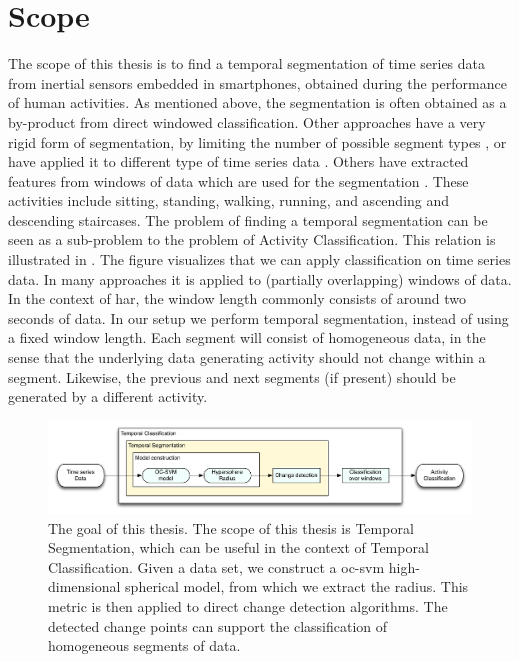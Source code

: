 \section{Scope}
The scope of this thesis is to find a temporal segmentation of time series data from inertial sensors embedded in smartphones, obtained during the performance of human activities.
As mentioned above, the segmentation is often obtained as a by-product from direct windowed classification.
Other approaches have a very rigid form of segmentation, \eg by limiting the number of possible segment types \cite{himberg2001time,chamroukhi2013joint}, or have applied it to different type of time series data \cite{li2007segmentation,fuchs2010online,guenterberg2009automatic}.
Others have extracted features from windows of data which are used for the segmentation \cite{guo2012adaptive}.
These activities include sitting, standing, walking, running, and ascending and descending staircases.
The problem of finding a temporal segmentation can be seen as a sub-problem to the problem of Activity Classification.
This relation is illustrated in .
The figure visualizes that we can apply classification on time series data.
In many approaches it is applied to (partially overlapping) windows of data.
In the context of \gls{har}, the window length commonly consists of around two seconds of data.
In our setup we perform temporal segmentation, instead of using a fixed window length.
Each segment will consist of homogeneous data, in the sense that the underlying data generating activity should not change within a segment.
Likewise, the previous and next segments (if present) should be generated by a different activity.

\begin{figure}[h]
  \centering
    \includegraphics[width=\textwidth,height=\textheight,keepaspectratio]{./Figures/chapter1/thesis_goal.pdf}
  \caption[Thesis goal]{The goal of this thesis. The scope of this thesis is Temporal Segmentation, which can be useful in the context of Temporal Classification. Given a data set, we construct a \gls{oc-svm} high-dimensional spherical model, from which we extract the radius. This metric is then applied to direct change detection algorithms. The detected change points can support the classification of homogeneous segments of data.}
  \label{fig:thesis_goal}
\end{figure}

